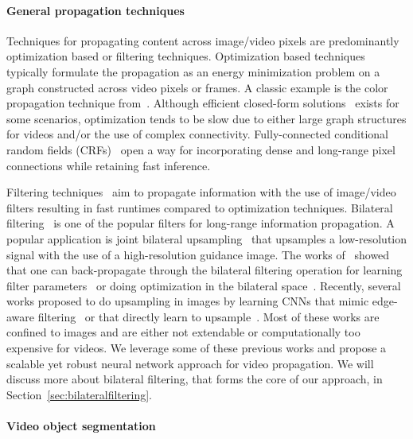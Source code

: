 \documentclass[10pt,twocolumn,letterpaper]{article}
\begin{document}
\paragraph{General propagation techniques}
Techniques for propagating content across image/video pixels are predominantly
optimization based or filtering techniques. Optimization
based techniques typically formulate the propagation as an energy minimization problem
on a graph constructed across video pixels or frames.
A classic example is the color propagation technique from~\cite{levin2004colorization}.
Although efficient closed-form
solutions~\cite{levin2008closed} exists for some scenarios,
optimization tends to be slow due to either large graph structures for videos and/or the use of
complex connectivity.
Fully-connected conditional
random fields (CRFs)~\cite{krahenbuhl2012efficient} open a way for incorporating dense
and long-range pixel connections while retaining fast inference.

Filtering techniques~\cite{kopf2007joint,chang2015propagated,he2010guided} aim to propagate
information with the use of image/video filters resulting in fast runtimes compared
to optimization techniques. Bilateral filtering~\cite{aurich1995non,tomasi1998bilateral} is
one of the popular filters for long-range information propagation.
A popular application is joint bilateral upsampling~\cite{kopf2007joint} that upsamples a low-resolution signal with the use of a high-resolution guidance image.
The works
of~\cite{li2014mean,domke2013learning,kiefel2014permutohedral,jampani_2016_cvpr,zheng2015conditional,schwing2015fully}
showed that one can back-propagate through the bilateral filtering operation for
learning filter parameters~\cite{kiefel2014permutohedral,jampani_2016_cvpr}
or doing optimization in the bilateral space~\cite{barron2015bilateral,barron2015defocus}.
Recently, several works proposed to do upsampling
in images by learning CNNs that mimic edge-aware filtering~\cite{xu2015deep} or
that directly learn to upsample~\cite{li2016deep,hui2016depth}.
Most of these works are confined to images and are either not extendable or computationally
too expensive for videos. We leverage some of these previous works and propose a
scalable yet robust neural network approach for video propagation.
We will discuss more about bilateral filtering,
that forms the core of our approach, in Section~\ref{sec:bilateralfiltering}.

\vspace{-0.5cm}
\paragraph{Video object segmentation}
\end{document}
